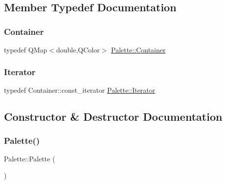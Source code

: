 \subsection{Member Typedef Documentation}
\mbox{\label{class_palette_a5215559c77b17d9ff9eaec3c0910f759}} 
\subsubsection{\texorpdfstring{Container}{Container}}
{\footnotesize\ttfamily typedef Q\+Map$<$double,Q\+Color$>$ \mbox{\hyperlink{class_palette_a5215559c77b17d9ff9eaec3c0910f759}{Palette\+::\+Container}}}

\mbox{\label{class_palette_adbfe061d30e0b5f90145bd302003fab0}} 
\subsubsection{\texorpdfstring{Iterator}{Iterator}}
{\footnotesize\ttfamily typedef Container\+::const\+\_\+iterator \mbox{\hyperlink{class_palette_adbfe061d30e0b5f90145bd302003fab0}{Palette\+::\+Iterator}}}



\subsection{Constructor \& Destructor Documentation}
\mbox{\label{class_palette_a6eb6cac583a840b5251897e3403eac5a}} 
\subsubsection{\texorpdfstring{Palette()}{Palette()}\hspace{0.1cm}{\footnotesize\ttfamily [1/3]}}
{\footnotesize\ttfamily Palette\+::\+Palette (\begin{DoxyParamCaption}{ }\end{DoxyParamCaption})}

\mbox{\label{class_palette_afc6b1651561efffe92d8674a490fe4f4}} 
